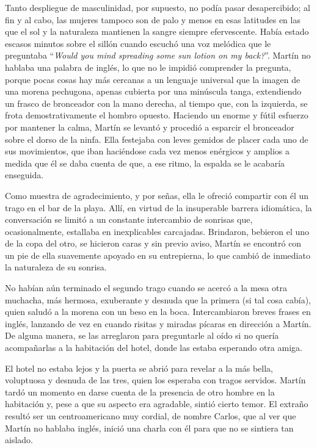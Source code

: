 \documentclass[12pt,twoside,openright,a5paper]{book}
\begin{document}
Tanto despliegue de masculinidad, por supuesto, no podía pasar desapercibido;
 al fin y al cabo, las mujeres tampoco son de palo y menos en esas
latitudes en las que el sol y la naturaleza mantienen la sangre siempre
efervescente. Había estado escasos minutos sobre el sillón cuando escuchó
una voz melódica que le preguntaba ``\emph{Would you mind spreading some sun
lotion on my back?}''. Martín no hablaba una palabra de inglés, lo que no
le impidió comprender la pregunta, porque pocas cosas hay más cercanas a
un lenguaje universal que la imagen de una morena pechugona, apenas cubierta
por una minúscula tanga, extendiendo un frasco de bronceador con la mano
derecha, al tiempo que, con la izquierda, se frota demostrativamente el
hombro opuesto. Haciendo un enorme y fútil esfuerzo por mantener la calma,
Martín se levantó y procedió a esparcir el bronceador sobre el dorso de la
ninfa. Ella festejaba con leves gemidos de placer cada uno de sus movimientos,
que iban haciéndose cada vez menos enérgicos y amplios a medida que él
se daba cuenta de que, a ese ritmo, la espalda se le acabaría enseguida.

Como muestra de agradecimiento, y por señas, ella le ofreció
compartir con él un trago en el bar de la playa. Allí, en virtud de la
insuperable barrera idiomática, la conversación se limitó a un constante
intercambio de sonrisas que, ocasionalmente, estallaba en inexplicables
carcajadas. Brindaron, bebieron el uno de la copa del otro, se hicieron caras
y sin previo aviso, Martín se encontró con un pie de ella suavemente apoyado
en su entrepierna, lo que cambió de inmediato la naturaleza de su sonrisa.

No habían aún terminado el segundo trago cuando se acercó a la mesa
otra muchacha, más hermosa, exuberante y desnuda que la primera (si tal
cosa cabía), quien saludó a la morena con un beso en la boca. Intercambiaron breves
frases en inglés, lanzando de vez en cuando risitas y miradas pícaras en
dirección a Martín. De alguna manera, se las arreglaron para preguntarle
al oído si no quería acompañarlas a la habitación del hotel, donde las
estaba esperando otra amiga.

El hotel no estaba lejos y la puerta se abrió para revelar a la más bella,
 voluptuosa y desnuda de las tres, quien los esperaba con tragos
servidos. Martín tardó un momento en darse cuenta de la presencia de otro
hombre en la habitación y, pese a que su aspecto era agradable, sintió
cierto temor. El extraño resultó ser un centroamericano muy cordial,
de nombre Carlos, que al ver que Martín no hablaba inglés, inició una
charla con él para que no se sintiera tan aislado.
\end{document}
